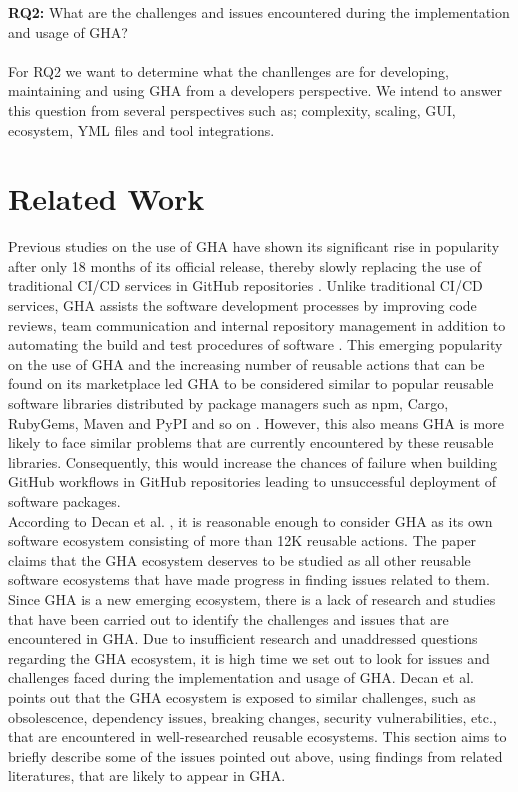 \documentclass[conference]{IEEEtran}
\begin{document}
     \textbf{RQ2:} What are the challenges and issues encountered during the implementation and usage of GHA?\\
\\
For RQ2 we want to determine what the chanllenges are for developing, maintaining and using GHA from a developers perspective. We intend to answer this question from several perspectives such as; complexity, scaling, GUI, ecosystem, YML files and tool integrations.


\section{Related Work}
Previous studies on the use of GHA have shown its significant rise in popularity after only 18 months of its official release, thereby slowly replacing the use of traditional CI/CD services in GitHub repositories \cite{b15}. Unlike traditional CI/CD services, GHA assists the software development processes by improving code reviews, team communication and internal repository management in addition to automating the build and test procedures of software \cite{b16}. This emerging popularity on the use of GHA and the increasing number of reusable actions that can be found on its marketplace led GHA to be considered similar to popular reusable software libraries distributed by package managers such as npm, Cargo, RubyGems, Maven and PyPI and so on \cite{b4}. However, this also means GHA is more likely to face similar problems that are currently encountered by these reusable libraries. Consequently, this would increase the chances of failure when building GitHub workflows in GitHub repositories leading to unsuccessful deployment of software packages. 
\\

According to Decan et al. \cite{b4}, it is reasonable enough to consider GHA as its own software ecosystem consisting of more than 12K reusable actions. The paper claims that the GHA ecosystem deserves to be studied as all other reusable software ecosystems that have made progress in finding issues related to them. Since GHA is a new emerging ecosystem, there is a lack of research and studies that have been carried out to identify the challenges and issues that are encountered in GHA. Due to insufficient research and unaddressed questions regarding the GHA ecosystem, it is high time we set out to look for issues and challenges faced during the implementation and usage of GHA. Decan et al. \cite{b4} points out that the GHA ecosystem is exposed to similar challenges, such as obsolescence, dependency issues, breaking changes, security vulnerabilities, etc., that are encountered in well-researched reusable ecosystems. This section aims to briefly describe some of the issues pointed out above, using findings from related literatures, that are likely to appear in GHA.
\end{document}
